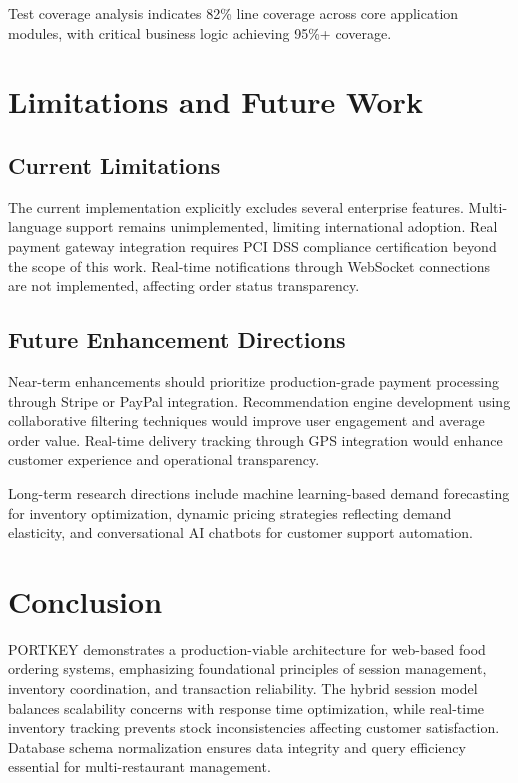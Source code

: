 \documentclass{ieeeaccess}
\begin{document}
Test coverage analysis indicates 82\% line coverage across core application modules, with critical business logic achieving 95\%+ coverage.

\section{Limitations and Future Work}
\label{sec:limitations}

\subsection{Current Limitations}
The current implementation explicitly excludes several enterprise features. Multi-language support remains unimplemented, limiting international adoption. Real payment gateway integration requires PCI DSS compliance certification beyond the scope of this work. Real-time notifications through WebSocket connections are not implemented, affecting order status transparency.

\subsection{Future Enhancement Directions}
Near-term enhancements should prioritize production-grade payment processing through Stripe or PayPal integration. Recommendation engine development using collaborative filtering techniques would improve user engagement and average order value. Real-time delivery tracking through GPS integration would enhance customer experience and operational transparency.

Long-term research directions include machine learning-based demand forecasting for inventory optimization, dynamic pricing strategies reflecting demand elasticity, and conversational AI chatbots for customer support automation.

\section{Conclusion}
\label{sec:conclusion}
PORTKEY demonstrates a production-viable architecture for web-based food ordering systems, emphasizing foundational principles of session management, inventory coordination, and transaction reliability. The hybrid session model balances scalability concerns with response time optimization, while real-time inventory tracking prevents stock inconsistencies affecting customer satisfaction. Database schema normalization ensures data integrity and query efficiency essential for multi-restaurant management.
\end{document}
